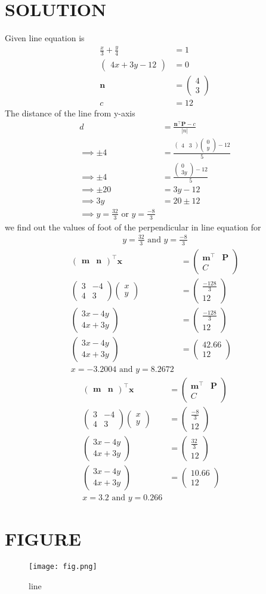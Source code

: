 \documentclass[12pt]{article}
\newcommand{\myvec}[1]{\ensuremath{\begin{pmatrix}#1\end{pmatrix}}}
\providecommand{\abs}[1]{\left\vert#1\right\vert}
\let\vec\mathbf
\begin{document}
\section{SOLUTION}
Given line equation is
\begin{align}
\frac{x}{3}+\frac{y}{4}&=1\\
\myvec{4x+3y-12}&=0\\
\vec{n}&=\myvec{4\\3}\\
c&=12
\end{align}
The distance of the line from y-axis
\begin{align}
d&=\frac{\vec{n}^\top\vec{P}-c}{\abs{n}}\\
\implies\pm4&=\frac{\myvec{4& 3}\myvec{0\\ y}-12}{5}\\
\implies\pm4&=\frac{\myvec{0\\ 3y}-12}{5}\\
\implies\pm20&=3y-12\\
\implies 3y&=20\pm12\\
\implies y= \frac{32}{3}\text{ or }y=\frac{-8}{3}
\end{align}
we find out the values of foot of the perpendicular in line equation for
\begin{align}
y=\frac{32}{3}\text{ and }y=\frac{-8}{3}
\end{align} 
\begin{align}
\myvec{\vec{m}& \vec{n}}^{\top}\vec{x}&=\myvec{\vec{m}^{\top}& \vec{P}\\ C }\\
\myvec{3& -4\\ 4& 3}\myvec{x\\y}&=\myvec{\frac{-128}{3}\\ 12}\\
\myvec{3x-4y\\4x+3y}&=\myvec{\frac{-128}{3}\\12}\\
\myvec{3x-4y\\4x+3y}&=\myvec{42.66\\12}\\
x=-3.2004 \text{ and } y=8.2672
\end{align} 
\begin{align}
\myvec{\vec{m}& \vec{n}}^{\top}\vec{x}&=\myvec{\vec{m}^{\top}& \vec{P}\\ C }\\
\myvec{3& -4\\ 4& 3}\myvec{x\\y}&=\myvec{\frac{-8}{3}\\ 12}\\
\myvec{3x-4y\\4x+3y}&=\myvec{\frac{32}{3}\\12}\\
\myvec{3x-4y\\4x+3y}&=\myvec{10.66\\12}\\
x=3.2 \text{ and } y=0.266
\end{align}
\section{FIGURE}
\begin{figure}[h]
\centering
\texttt{[image: fig.png]}
\caption{line}
		\label{fig:Figure}
\end{figure}
\end{document}
